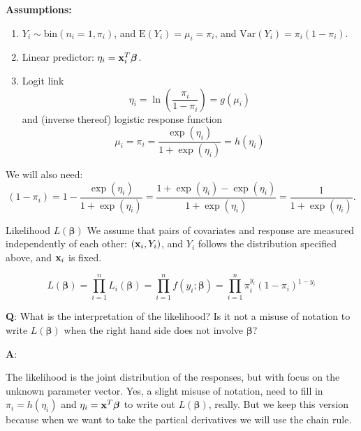 \documentclass[
  ignorenonframetext,
]{beamer}
\begin{document}
\begin{frame}
\textbf{Assumptions:}

\begin{enumerate}
\item
  \(Y_i \sim \text{bin}(n_i=1,\pi_i)\), and
  \(\text{E}(Y_i)=\mu_i=\pi_i\), and \(\text{Var}(Y_i)=\pi_i(1-\pi_i)\).
\item
  Linear predictor: \(\eta_i={\bf x}_i^T \boldsymbol{\beta}\).
\item
  Logit link \[\eta_i=\ln(\frac{\pi_i}{1-\pi_i})=g(\mu_i)\] and (inverse
  thereof) logistic response function
  \[\mu_i=\pi_i=\frac{\exp(\eta_i)}{1+\exp(\eta_i)}=h(\eta_i)\]
\end{enumerate}

We will also need:
\[(1-\pi_i)=1-\frac{\exp(\eta_i)}{1+\exp(\eta_i)}=\frac{1+\exp(\eta_i)-\exp(\eta_i)}{1+\exp(\eta_i)}=\frac{1}{1+\exp(\eta_i)}.\]
\end{frame}

\begin{frame}
\begin{block}{Likelihood \(L(\boldsymbol{\beta})\)}
\protect\hypertarget{likelihood-lboldsymbolbeta}{}
We assume that pairs of covariates and response are measured
independently of each other: \(({\bf x}_i,Y_i)\), and \(Y_i\) follows
the distribution specified above, and \({\bf x}_i\) is fixed.

\[L(\boldsymbol{\beta})=\prod_{i=1}^n L_i(\boldsymbol{\beta})=\prod_{i=1}^n f(y_i; \boldsymbol{\beta})=\prod_{i=1}^n\pi_i^{y_i}(1-\pi_i)^{1-y_i}\]

\textbf{Q}: What is the interpretation of the likelihood? Is it not a
misuse of notation to write \(L(\boldsymbol{\beta})\) when the right
hand side does not involve \(\boldsymbol{\beta}\)?

\textbf{A}:

The likelihood is the joint distribution of the responses, but with
focus on the unknown parameter vector. Yes, a slight misuse of notation,
need to fill in \(\pi_i=h(\eta_i)\) and
\(\eta_i={\bf x}^T\boldsymbol{\beta}\) to write out
\(L(\boldsymbol{\beta})\), really. But we keep this version because when
we want to take the partical derivatives we will use the chain rule.
\end{block}
\end{frame}
\end{document}
